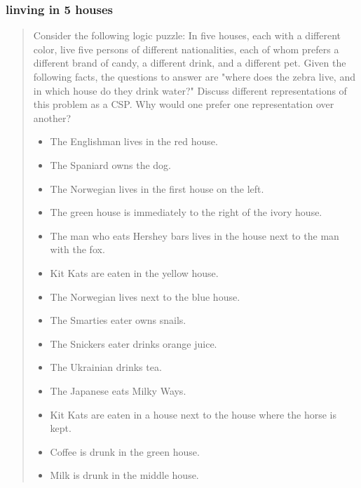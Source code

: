 \subsubsection{linving in 5 houses}
\begin{quote}
  Consider the following logic puzzle: In five houses, each with a
  different color, live five persons of different nationalities, each
  of whom prefers a different brand of candy, a different drink, and a
  different pet.  Given the following facts, the questions to answer
  are "where does the zebra live, and in which house do they drink
  water?"  Discuss different representations of this problem as a CSP.
  Why would one prefer one representation over another?
  \begin{itemize}
  \item The Englishman lives in the red house.
  \item The Spaniard owns the dog.
  \item The Norwegian lives in the first house on the left.
  \item The green house is immediately to the right of the ivory house.
  \item The man who eats Hershey bars lives in the house next to the man with the fox.
  \item Kit Kats are eaten in the yellow house.
  \item The Norwegian lives next to the blue house.
  \item The Smarties eater owns snails.
  \item The Snickers eater drinks orange juice.
  \item The Ukrainian drinks tea.
  \item The Japanese eats Milky Ways.
  \item Kit Kats are eaten in a house next to the house where the horse is kept.
  \item Coffee is drunk in the green house.
  \item Milk is drunk in the middle house.
  \end{itemize}
\end{quote}


